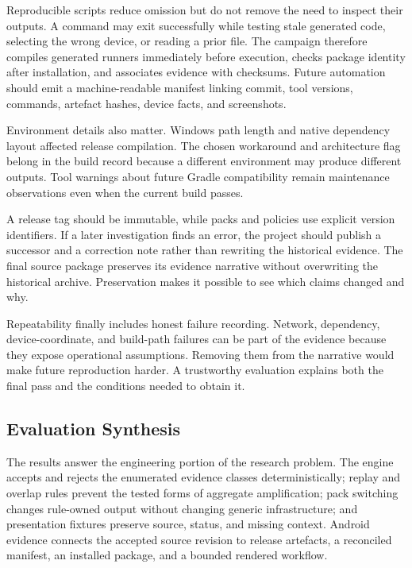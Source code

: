 Reproducible scripts reduce omission but do not remove the need to inspect their outputs. A command may exit successfully while testing stale generated code, selecting the wrong device, or reading a prior file. The campaign therefore compiles generated runners immediately before execution, checks package identity after installation, and associates evidence with checksums. Future automation should emit a machine-readable manifest linking commit, tool versions, commands, artefact hashes, device facts, and screenshots.

Environment details also matter. Windows path length and native dependency layout affected release compilation. The chosen workaround and architecture flag belong in the build record because a different environment may produce different outputs. Tool warnings about future Gradle compatibility remain maintenance observations even when the current build passes.

A release tag should be immutable, while packs and policies use explicit version identifiers. If a later investigation finds an error, the project should publish a successor and a correction note rather than rewriting the historical evidence. The final source package preserves its evidence narrative without overwriting the historical archive. Preservation makes it possible to see which claims changed and why.

Repeatability finally includes honest failure recording. Network, dependency, device-coordinate, and build-path failures can be part of the evidence because they expose operational assumptions. Removing them from the narrative would make future reproduction harder. A trustworthy evaluation explains both the final pass and the conditions needed to obtain it.

\subsection{Evaluation Synthesis}

The results answer the engineering portion of the research problem. The engine accepts and rejects the enumerated evidence classes deterministically; replay and overlap rules prevent the tested forms of aggregate amplification; pack switching changes rule-owned output without changing generic infrastructure; and presentation fixtures preserve source, status, and missing context. Android evidence connects the accepted source revision to release artefacts, a reconciled manifest, an installed package, and a bounded rendered workflow.

